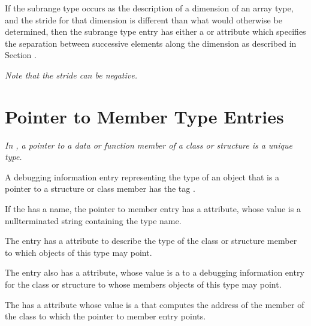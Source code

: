 {If the subrange type occurs as the description of a dimension
of an array type, and the stride for that dimension 
is\hypertarget{chap:DWATbytestridesubrangestridedimensionofarraytype}{}
different than what would otherwise be determined, 
then\hypertarget{chap:DWATbitstridesubrangestridedimensionofarraytype}{}
the subrange type entry has either a
\DWATbytestrideDEFN{} or
\DWATbitstrideDEFN{} attribute 
which specifies the separation
between successive elements along the dimension as described in 
Section .

\textit{Note that the stride can be negative.}

\section{Pointer to Member Type Entries}
\label{chap:pointertomembertypeentries}

\textit{In , a 
pointer to a data or function member of a class or
structure is a unique type.}

A debugging information entry representing the type of an
object that is a pointer to a structure or class member has
the tag \DWTAGptrtomembertypeTARG.

If the  has a name, the 
pointer to member entry has a
\DWATname{} attribute, 
whose value is a
null\dash terminated string containing the type name.

The  entry 
has 
a \DWATtype{} attribute to
describe the type of the class or structure member to which
objects of this type may point.

The  entry 
also\hypertarget{chap:DWATcontainingtypecontainingtypeofpointertomembertype}{}
has a \DWATcontainingtypeDEFN{} attribute, 
whose value is a  to a debugging
information entry for the class or structure to whose members
objects of this type may point.

The\hypertarget{chap:DWATuselocationmemberlocationforpointertomembertype}{}
 has a 
\DWATuselocationDEFN{} attribute
whose value is a 
 that computes the
address of the member of the class to which the pointer to
member entry points.

}

